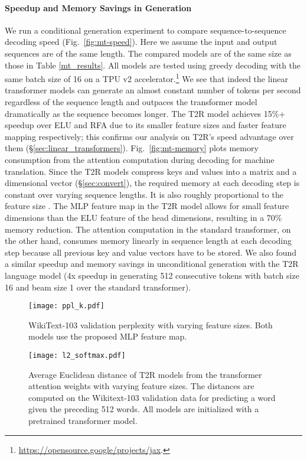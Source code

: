 \documentclass[11pt,a4paper]{article}
\newcommand{\TRNN}{T2R\xspace}
\begin{document}
\paragraph{Speedup and Memory Savings in Generation}
We run a conditional generation experiment to compare sequence-to-sequence decoding speed (Fig.\ \ref{fig:mt-speed}). Here we assume the input and output sequences are of the same length. The compared models are of the same size as those in Table \ref{mt_results}.
All models are tested using greedy decoding with the same batch size of 16 on a TPU v2 accelerator.\footnote{\url{https://opensource.google/projects/jax}.}
We see that indeed the linear transformer models can generate an almost constant number of tokens per second regardless of the sequence length and outpaces the transformer model dramatically as the sequence becomes longer.
The \TRNN model achieves 15\%+ speedup over ELU and RFA due to its smaller feature sizes and faster feature mapping respectively; this confirms our analysis on \TRNN's speed advantage over them (\S\ref{sec:linear_transformers}).
Fig.\ \ref{fig:mt-memory} plots memory consumption from the attention computation during decoding for machine translation. Since the \TRNN models compress keys and values into a  matrix  and a  dimensional vector  (\S\ref{sec:convert}), the required memory at each decoding step is constant over varying sequence lengths.
It is also roughly proportional to the feature size . The MLP feature map in the \TRNN model allows for small feature dimensions than the ELU feature of the head dimensions, resulting in a 70\% memory reduction.
The attention computation in the standard transformer, on the other hand, consumes memory linearly in sequence length at each decoding step because all previous key and value vectors have to be stored.
We also found a similar speedup and memory savings in unconditional generation with the \TRNN language model (4x speedup in generating 512 consecutive tokens with batch size 16 and beam size 1 over the standard transformer).




\begin{figure}[h]
\centering
    \texttt{[image: ppl\_k.pdf]}
\caption{WikiText-103 validation perplexity with varying feature sizes. Both models use the proposed MLP feature map.
}
\label{ppl-k}
\end{figure}
\begin{figure}
\centering
    \texttt{[image: l2\_softmax.pdf]}
\caption{Average Euclidean distance of \TRNN models from the transformer attention weights with varying feature sizes. The distances are computed on the Wikitext-103 validation data for predicting a word given the preceding 512 words.
All models are initialized with a pretrained transformer model.
}
\label{fig:l2-kernel}
\end{figure}
\end{document}
